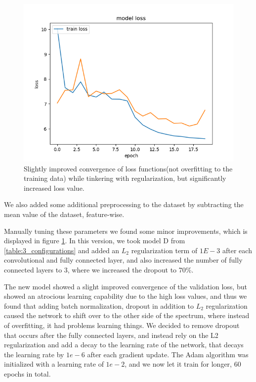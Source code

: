 \documentclass{kthreport}
\begin{document}
\begin{figure}
  \includegraphics[width=\linewidth]{../images/improved_loss_1.png}
  \caption[]
  {\small Slightly improved convergence of loss functions(not overfitting to the training data) while tinkering with regularization, but significantly increased loss value.}
  \label{fig:loss_improved_1}
\end{figure}
\FloatBarrier

We also added some additional preprocessing to the dataset by subtracting the mean value of the dataset, feature-wise.

Manually tuning these parameters we found some minor improvements, which is displayed in figure \ref{fig:loss_improved_1}. In this version, we took model D from \ref{table:3_configurations} and added an $L_{2}$ regularization term of $1E-3$ after each convolutional and fully connected layer, and also increased the number of fully connected layers to 3, where we increased the dropout to 70\%.


The new model showed a slight improved convergence of the validation loss, but showed an atrocious learning capability due to the high loss values, and thus we found that adding batch normalization, dropout in addition to $L_{2}$ regularization caused the network to shift over to the other side of the spectrum, where instead of overfitting, it had problems learning things. We decided to remove dropout that occurs after the fully connected layers, and instead rely on the L2 regularization and add a decay to the learning rate of the network, that decays the learning rate by $1e-6$ after each gradient update. The Adam algorithm was initialized with a learning rate of $1e-2$, and we now let it train for longer, 60 epochs in total.
\end{document}
